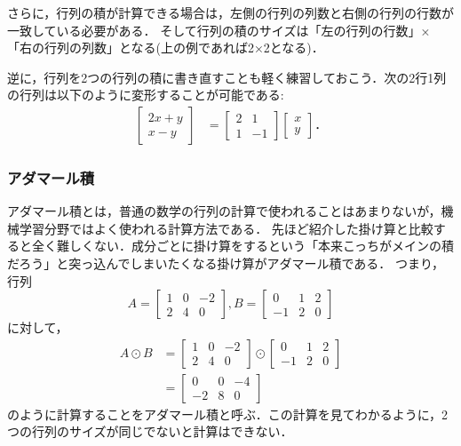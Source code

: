 \documentclass[a4paper,12pt,autodetect-engine,dvipdfmx]{jsarticle}
\theoremstyle{definition}
\begin{document}
さらに，行列の積が計算できる場合は，左側の行列の列数と右側の行列の行数が一致している必要がある．
そして行列の積のサイズは「左の行列の行数」×「右の行列の列数」となる(上の例であれば2×2となる)．

逆に，行列を2つの行列の積に書き直すことも軽く練習しておこう．次の2行1列の行列は以下のように変形することが可能である:
\begin{align*}
    \begin{bmatrix}
        2x + y \\
        x - y
    \end{bmatrix}
    &=
    \begin{bmatrix}
        2 & 1 \\
        1 & -1
    \end{bmatrix}
    \begin{bmatrix}
        x \\
        y
    \end{bmatrix}．
\end{align*}



\subsubsection{アダマール積}
アダマール積とは，普通の数学の行列の計算で使われることはあまりないが，機械学習分野ではよく使われる計算方法である．
先ほど紹介した掛け算と比較すると全く難しくない．成分ごとに掛け算をするという「本来こっちがメインの積だろう」と突っ込んでしまいたくなる掛け算がアダマール積である．
つまり，
行列
\begin{equation*}
    A = \begin{bmatrix}
        1 & 0 & -2 \\
        2 & 4 & 0
    \end{bmatrix},
    B = \begin{bmatrix}
        0 & 1 & 2 \\
        -1 & 2 & 0
    \end{bmatrix}
\end{equation*}
に対して，
\begin{align*}
    A \odot B &= \begin{bmatrix}
        1 & 0 & -2 \\
        2 & 4 & 0
    \end{bmatrix}
    \odot \begin{bmatrix}
        0 & 1 & 2 \\
        -1 & 2 & 0
    \end{bmatrix}\\
    &= \begin{bmatrix}
        0 & 0 & -4\\
        -2 & 8 & 0
    \end{bmatrix}
\end{align*}
のように計算することをアダマール積と呼ぶ．この計算を見てわかるように，2つの行列のサイズが同じでないと計算はできない．
\end{document}

